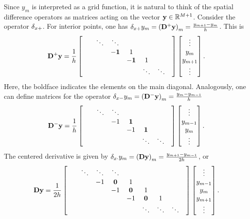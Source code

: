 Since $y_m$ is interpreted as a grid function, it is natural to think of the spatial difference operators as matrices acting on the vector ${\bf y} \in \mathbb{R}^{M+1}$. Consider the operator $\delta_{x+}$. For interior points, one has $\delta_{x+} y_m = \left({\bf D}^+ {\bf y}\right)_m = \frac{y_{m+1}-y_m}{h}$. This is
\begin{equation}
{\bf D}^+ {\bf y} = \frac{1}{h}\begin{bmatrix}
& & {\bf \ddots}  & \ddots & & & \\ 
& & & {\bf -1} & 1 & & &\\
& & & & {\bf -1} & 1 & & \\
& & & & & \ddots & \ddots & \\
\end{bmatrix}
\begin{bmatrix}
\vdots \\
y_m \\
y_{m+1}\\
\vdots
\end{bmatrix}.
\end{equation}
Here, the boldface indicates the elements on the main diagonal. Analogously, one can define matrices for the operator $\delta_{x-} y_m = \left({\bf D}^- {\bf y}\right)_m = \frac{y_{m}-y_{m-1}}{h}$
\begin{equation}
{\bf D}^- {\bf y} = \frac{1}{h}\begin{bmatrix}
& & \ddots  & \ddots & & & \\ 
& & & -1 & {\bf 1} & & &\\
& & & & -1 & {\bf 1} & & \\
& & & & & \ddots & \ddots & \\
\end{bmatrix}
\begin{bmatrix}
\vdots \\
y_{m-1}\\
y_{m}\\
\vdots
\end{bmatrix}.
\end{equation}
The centered derivative is given by $\delta_{x\cdot} y_m = \left({\bf D} {\bf y}\right)_m = \frac{y_{m+1} - y_{m-1}}{2h}$, or
\begin{equation}
{\bf D} {\bf y} = \frac{1}{2 h}\begin{bmatrix}
& & \ddots  & \ddots & \ddots & & & &\\ 
& & & -1 & {\bf 0} & 1 & & & &\\
& & & & -1 & {\bf 0 } & 1 &  & &\\
& & & & & -1 & {\bf 0 } & 1 &  & \\
& & & & & & \ddots & \ddots &  \ddots & \\
\end{bmatrix}
\begin{bmatrix}
\vdots \\
y_{m-1}\\
y_{m}\\
y_{m+1} \\
\vdots
\end{bmatrix}.
\end{equation}

